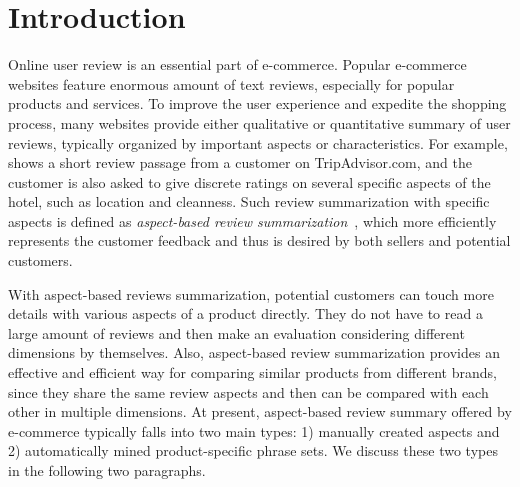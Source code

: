 \section{Introduction}
\label{sec:intro}

Online user review is an essential part of e-commerce. 
Popular e-commerce websites feature enormous amount of text reviews, especially for popular products and services. 
To improve the user experience and expedite the
shopping process, many websites provide either qualitative or quantitative
summary of user reviews, typically organized by important aspects or characteristics.
For example,  shows a short review passage from a customer on TripAdvisor.com, and the customer is also asked
to give discrete ratings on several specific aspects of 
the hotel, such as location and cleanness. 
Such review summarization with specific aspects is defined as \emph{aspect-based review 
	summarization}~\cite{hu2004mining}, which more efficiently represents the customer feedback and thus is desired by both sellers and potential customers.

With aspect-based reviews summarization, potential customers can touch more details with various aspects of a product directly. 
They do not have to read a large amount of reviews and then make an evaluation considering different dimensions by themselves.
Also,   
aspect-based review summarization provides an effective and efficient way for 
comparing similar products from different brands, since they share 
the same review aspects and then can be compared with each other in multiple dimensions.
At present, aspect-based review summary offered by e-commerce typically 
falls into two main types: 
1) manually created aspects and 2) automatically mined product-specific phrase sets.
We discuss these two types in the following two paragraphs.





